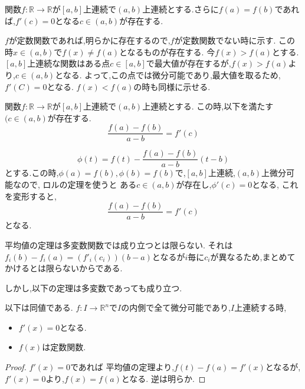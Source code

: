 \begin{thm}[ロルの定理]
関数$f: \mathbb{R} \to \mathbb{R}$が$[a, b]$上連続で$(a, b)$上連続とする.さらに$f(a) = f(b)$であれば,$f'(c) = 0$となる$c \in (a,b)$が存在する.
\end{thm}
$f$が定数関数であれば,明らかに存在するので,$f$が定数関数でない時に示す.
この時$x \in (a,b)$で$f(x) \neq f(a)$となるものが存在する.
今$f(x) > f(a)$とする.
$[a, b]$上連続な関数はある点$c \in [a, b]$で最大値が存在するが,$f(x) > f(a)$より,$c \in (a, b)$となる.
よって,この点では微分可能であり,最大値を取るため,$f'(C) = 0$となる.
$f(x) < f(a)$の時も同様に示せる.

\begin{thm}[平均値の定理]
関数$f: \mathbb{R} \to \mathbb{R}$が$[a, b]$上連続で$(a, b)$上連続とする.
この時,以下を満たす$(c \in (a, b)$が存在する.
\begin{equation*}
  \frac{f(a) - f(b)}{a-b} = f'(c)
\end{equation*}
\end{thm}
\begin{equation*}
\phi(t) = f(t) -  \frac{f(a) - f(b)}{a- b}(t - b)
\end{equation*}
とする.この時,$\phi(a) = f(b), \phi(b) = f(b)$で,$[a, b]$上連続,$(a, b)$上微分可能なので,
ロルの定理を使うと
ある$c \in (a, b)$が存在し,$\phi'(c) = 0$となる,
これを変形すると,
\begin{equation*}
  \frac{f(a) - f(b)}{a-b} = f'(c)
\end{equation*}
となる.

\begin{rem}
  平均値の定理は多変数関数では成り立つとは限らない.
  それは$f_i(b) - f_i(a) = (f'_i(c_i))(b-a)$となるが$i$毎に$c_i$が異なるため,まとめてかけるとは限らないからである.
\end{rem}

しかし,以下の定理は多変数であっても成り立つ.
\begin{thm}
  以下は同値である.
  $f:I \to \mathbb{R}^n$で$I$の内側で全て微分可能であり,$I$上連続する時,
  \begin{itemize}
    \item $f'(x) = 0$となる.
    \item $f(x)$は定数関数.
  \end{itemize}
\end{thm}
\begin{proof}
$f'(x) = 0$であれば
平均値の定理より,$f(t) - f(a) = f'(x)$となるが,$f'(x) = 0$より,$f(x) = f(a)$となる.
逆は明らか.
\end{proof}

